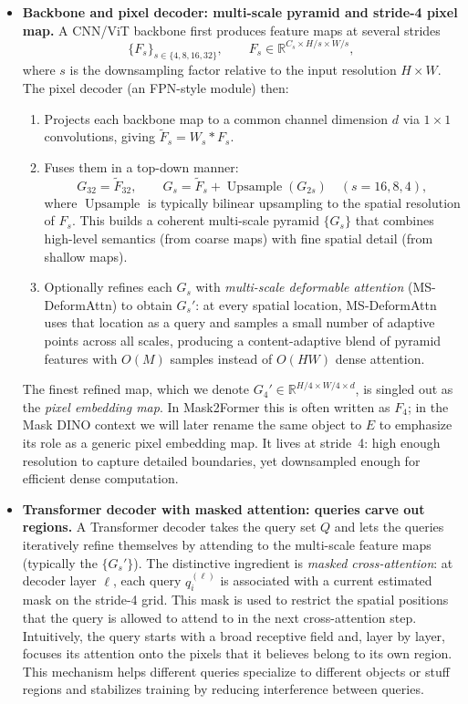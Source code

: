 \begin{enrichment}
\begin{enrichment}
		\begin{itemize}
			\item \textbf{Backbone and pixel decoder: multi-scale pyramid and stride-4 pixel map.} A CNN/ViT backbone first produces feature maps at several strides
			\[
			\{F_s\}_{s \in \{4,8,16,32\}}, \qquad F_s \in \mathbb{R}^{C_s \times H/s \times W/s},
			\]
			where $s$ is the downsampling factor relative to the input resolution $H \times W$. The pixel decoder (an FPN-style module) then:
			\begin{enumerate}
				\item Projects each backbone map to a common channel dimension $d$ via $1\times 1$ convolutions, giving $\tilde F_s = W_s * F_s$.
				\item Fuses them in a top-down manner:
				\[
				G_{32} = \tilde F_{32}, \qquad
				G_s = \tilde F_s + \operatorname{Upsample}(G_{2s}) \quad (s=16,8,4),
				\]
				where $\operatorname{Upsample}$ is typically bilinear upsampling to the spatial resolution of $F_s$. This builds a coherent multi-scale pyramid $\{G_s\}$ that combines high-level semantics (from coarse maps) with fine spatial detail (from shallow maps).
				\item Optionally refines each $G_s$ with \emph{multi-scale deformable attention} (MS-DeformAttn) to obtain $G_s'$: at every spatial location, MS-DeformAttn uses that location as a query and samples a small number of adaptive points across all scales, producing a content-adaptive blend of pyramid features with $O(M)$ samples instead of $O(HW)$ dense attention.
			\end{enumerate}
			The finest refined map, which we denote $G_4' \in \mathbb{R}^{H/4 \times W/4 \times d}$, is singled out as the \emph{pixel embedding map}. In Mask2Former this is often written as $F_4$; in the Mask DINO context we will later rename the same object to $E$ to emphasize its role as a generic pixel embedding map. It lives at stride~4: high enough resolution to capture detailed boundaries, yet downsampled enough for efficient dense computation.
			
			\item \textbf{Transformer decoder with masked attention: queries carve out regions.} A Transformer decoder takes the query set $Q$ and lets the queries iteratively refine themselves by attending to the multi-scale feature maps (typically the $\{G_s'\}$). The distinctive ingredient is \emph{masked cross-attention}: at decoder layer $\ell$, each query $q_i^{(\ell)}$ is associated with a current estimated mask on the stride-4 grid. This mask is used to restrict the spatial positions that the query is allowed to attend to in the next cross-attention step. Intuitively, the query starts with a broad receptive field and, layer by layer, focuses its attention onto the pixels that it believes belong to its own region. This mechanism helps different queries specialize to different objects or stuff regions and stabilizes training by reducing interference between queries.
			

\end{itemize}
\end{enrichment}
\end{enrichment}
